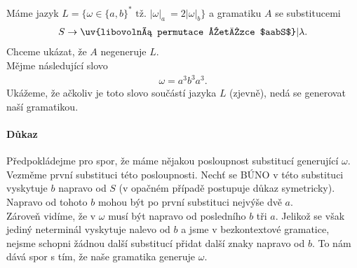 \documentclass{scrartcl}
\begin{document}
    Máme jazyk $L = \{\omega \in  \{a,b\}^* \text{ tž. } \vert \omega \vert_a\ = 2\vert \omega \vert_b\}$ a gramatiku $A$ se substitucemi
    \begin{align*}
        S \rightarrow \text{\uv{libovolná permutace řetězce $aabS$}} \vert \lambda.
    \end{align*} 
    Chceme ukázat, že $A$ negeneruje $L$.\\

    Mějme následující slovo
    \begin{align*}
        \omega = a^3b^3a^3.
    \end{align*}
    Ukážeme, že ačkoliv je toto slovo součástí jazyka $L$ (zjevně), nedá se generovat naší gramatikou.

    \paragraph{Důkaz}
    Předpokládejme pro spor, že máme nějakou posloupnost substitucí generující $\omega$. Vezměme první substituci této posloupnosti. Nechť se BÚNO v této substituci vyskytuje $b$ napravo od $S$ (v opačném případě postupuje důkaz symetricky). Napravo od tohoto $b$ mohou být po první substituci nejvýše dvě $a$. \\
    
    Zároveň vidíme, že v $\omega$ musí být napravo od posledního $b$ tři $a$. Jelikož se však jediný neterminál vyskytuje nalevo od $b$ a jsme v bezkontextové gramatice, nejsme schopni žádnou další substitucí přidat další znaky napravo od $b$. To nám dává spor s tím, že naše gramatika generuje $\omega$.
\end{document}
